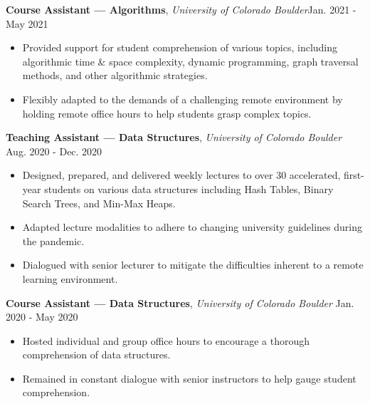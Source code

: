 \documentclass[12pt]{article}
\begin{document}
\begin{flushleft}
  \hrulefill {} \quad \hrulefill
  \vspace{2mm}

  {\textbf{Course Assistant — Algorithms}}, \textit{University of Colorado Boulder}\hfill Jan. 2021 - May 2021
  \vspace{-2mm}
  \begin{itemize} \setlength\itemsep{-0.3em}
    \item Provided support for student comprehension of various topics, including algorithmic time \& space complexity, dynamic programming, graph traversal methods, and other algorithmic strategies.
  \item Flexibly adapted to the demands of a challenging remote environment by holding remote office hours to help students grasp complex topics.   
\end{itemize}

  \vspace{-1mm}

  {\textbf{Teaching Assistant — Data Structures}}, \textit{University of Colorado Boulder}  \hfill Aug. 2020 - Dec. 2020
  \vspace{-2mm}
  \begin{itemize} \setlength\itemsep{-0.3em}
    \item Designed, prepared, and delivered weekly lectures to over 30 accelerated, first-year students on various data structures including Hash Tables, Binary Search Trees, and Min-Max Heaps. %

    \item Adapted lecture modalities  to adhere to changing university guidelines during the pandemic.
    \item Dialogued with senior lecturer to mitigate the difficulties inherent to a remote learning environment.
  \end{itemize}

  \vspace{-1mm}

  {\textbf{Course Assistant — Data Structures}}, \textit{University of Colorado Boulder} \hfill Jan. 2020 - May 2020
  \vspace{-2mm}
  \begin{itemize} \setlength\itemsep{-0.3em}
    \item Hosted individual and group office hours to encourage a thorough comprehension of data structures.
    \item Remained in constant dialogue with senior instructors to help gauge student comprehension.
  \end{itemize}
\end{flushleft}
\end{document}
